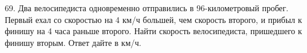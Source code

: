 69. Два велосипедиста одновременно отправились в 96-километровый пробег. Первый ехал со скоростью на 4 км/ч большей, чем скорость второго, и прибыл к финишу на 4 часа раньше второго. Найти скорость велосипедиста, пришедшего к финишу вторым. Ответ дайте в км/ч.\\
